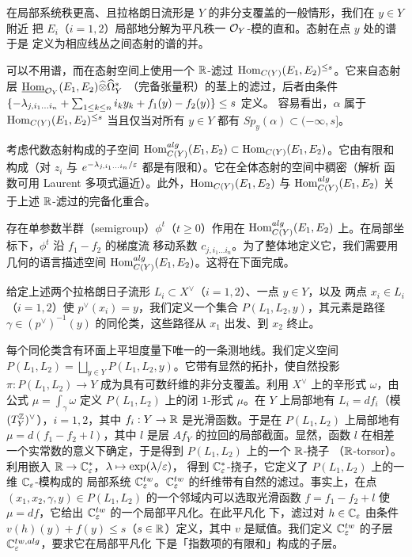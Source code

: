 在局部系统秩更高、且拉格朗日流形是 $Y$ 的非分支覆盖的一般情形，我们在 $y\in Y$ 附近
把 $E_i$（$i=1,2$）局部地分解为平凡秩一 $\mathcal{O}_Y$-模的直和。态射在点 $y$ 处的谱于是
定义为相应线丛之间态射的谱的并。

\begin{rmk}
可以不用谱，而在态射空间上使用一个 $\mathbb{R}$-滤过
$\operatorname{Hom}_{C(Y)}(E_1,E_2)^{\le s}$。它来自态射层
$\underline{\operatorname{Hom}}_{\mathcal{O}_Y}(E_1,E_2)\widehat{\otimes}\widehat{\Omega}^{*}_Y$
（完备张量积）的茎上的滤过，后者由条件
$\{-\lambda_{j,i_1\dots i_n}+\sum_{1\le k\le n}i_ky_k+f_1(y)-f_2(y)\}\le s$ 定义。
容易看出，$\alpha$ 属于 $\operatorname{Hom}_{C(Y)}(E_1,E_2)^{\le s}$ 当且仅当对所有 $y\in Y$
都有 $Sp_y(\alpha)\subset(-\infty,s]$。
\end{rmk}

考虑代数态射构成的子空间
$\operatorname{Hom}^{alg}_{C(Y)}(E_1,E_2)\subset\operatorname{Hom}_{C(Y)}(E_1,E_2)$。它由有限和构成（对 $z_i$
与 $e^{-\lambda_{j,i_1\dots i_n}/\varepsilon}$ 都是有限和）。它在全体态射的空间中稠密（解析
函数可用 Laurent 多项式逼近）。此外，$\operatorname{Hom}_{C(Y)}(E_1,E_2)$ 与
$\operatorname{Hom}^{alg}_{C(Y)}(E_1,E_2)$ 关于上述 $\mathbb{R}$-滤过的完备化重合。

存在单参数半群（semigroup）$\phi^t$（$t\ge0$）作用在
$\operatorname{Hom}^{alg}_{C(Y)}(E_1,E_2)$ 上。在局部坐标下，$\phi^t$ 沿 $f_1-f_2$ 的梯度流
移动系数 $c_{j,i_1\dots i_n}$。为了整体地定义它，我们需要用几何的语言描述空间
$\operatorname{Hom}^{alg}_{C(Y)}(E_1,E_2)$。这将在下面完成。

给定上述两个拉格朗日子流形 $L_i\subset X^{\vee}$（$i=1,2$）、一点 $y\in Y$，以及
两点 $x_i\in L_i$（$i=1,2$）使 $p^{\vee}(x_i)=y$，我们定义一个集合
$P(L_1,L_2,y)$，其元素是路径 $\gamma\in(p^{\vee})^{-1}(y)$ 的同伦类，这些路径从
$x_1$ 出发、到 $x_2$ 终止。

每个同伦类含有环面上平坦度量下唯一的一条测地线。我们定义空间
$P(L_1,L_2)=\bigsqcup_{y\in Y}P(L_1,L_2,y)$。它带有显然的拓扑，使自然投影
$\pi:P(L_1,L_2)\to Y$ 成为具有可数纤维的非分支覆盖。利用 $X^{\vee}$ 上的辛形式
$\omega$，由公式 $\mu=\int_{\gamma}\omega$ 定义 $P(L_1,L_2)$ 上的闭 $1$-形式
$\mu$。在 $Y$ 上局部地有 $L_i=df_i$（模 $(T^{\mathbb{Z}}_Y)^{\vee}$），$i=1,2$，其中
$f_i:Y\to\mathbb{R}$ 是光滑函数。于是在 $P(L_1,L_2)$ 上局部地有
$\mu=d(f_1-f_2+l)$，其中 $l$ 是层 $Af_Y$ 的拉回的局部截面。显然，函数 $l$ 在相差
一个实常数的意义下确定，于是得到 $P(L_1,L_2)$ 上的一个 $\mathbb{R}$-挠子
（$\mathbb{R}$-torsor）。利用嵌入 $\mathbb{R}\to\mathbb{C}^{*}_{\varepsilon}$，$\lambda\mapsto\exp(\lambda/\varepsilon)$，
得到 $\mathbb{C}^{*}_{\varepsilon}$-挠子，它定义了 $P(L_1,L_2)$ 上的一维 $\mathbb{C}_{\varepsilon}$-模构成的
局部系统 $\mathbb{C}^{tw}_{\varepsilon}$。$\mathbb{C}^{tw}_{\varepsilon}$ 的纤维带有自然的滤过。事实上，在点
$(x_1,x_2,\gamma,y)\in P(L_1,L_2)$ 的一个邻域内可以选取光滑函数
$f=f_1-f_2+l$ 使 $\mu=df$，它给出 $\mathbb{C}^{tw}_{\varepsilon}$ 的一个局部平凡化。在此平凡化
下，滤过对 $h\in\mathbb{C}_{\varepsilon}$ 由条件 $v(h)(y)+f(y)\le s$（$s\in\mathbb{R}$）定义，其中 $v$
是赋值。我们定义 $\mathbb{C}^{tw}_{\varepsilon}$ 的子层 $\mathbb{C}^{tw,alg}_{\varepsilon}$，要求它在局部平凡化
下是「指数项的有限和」构成的子层。

